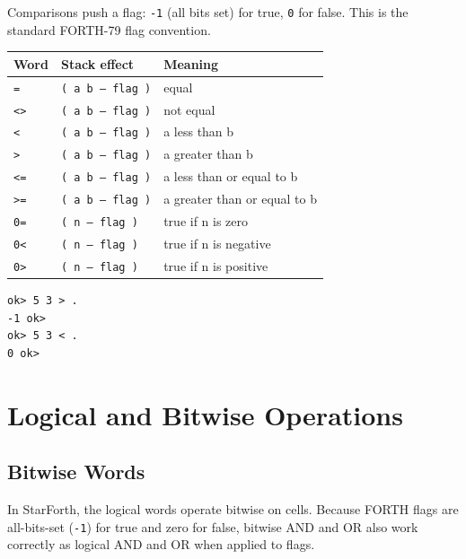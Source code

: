 Comparisons push a flag: \texttt{-1} (all bits set) for true, \texttt{0} for
false. This is the standard FORTH-79 flag convention.

\begin{center}
\begin{tabular}{lll}
\toprule
Word & Stack effect & Meaning \\
\midrule
\texttt{=}  & \texttt{( a b -- flag )} & equal \\
\texttt{<>} & \texttt{( a b -- flag )} & not equal \\
\texttt{<}  & \texttt{( a b -- flag )} & a less than b \\
\texttt{>}  & \texttt{( a b -- flag )} & a greater than b \\
\texttt{<=} & \texttt{( a b -- flag )} & a less than or equal to b \\
\texttt{>=} & \texttt{( a b -- flag )} & a greater than or equal to b \\
\texttt{0=} & \texttt{( n -- flag )} & true if n is zero \\
\texttt{0<} & \texttt{( n -- flag )} & true if n is negative \\
\texttt{0>} & \texttt{( n -- flag )} & true if n is positive \\
\bottomrule
\end{tabular}
\end{center}

\begin{lstlisting}[language=Forth]
ok> 5 3 > .
-1 ok>
ok> 5 3 < .
0 ok>
\end{lstlisting}

\chapter{Logical and Bitwise Operations}
\label{chap:logic}

\section{Bitwise Words}
\label{sec:bitwise}

In StarForth, the logical words operate bitwise on cells. Because FORTH flags
are all-bits-set (\texttt{-1}) for true and zero for false, bitwise AND and OR
also work correctly as logical AND and OR when applied to flags.

